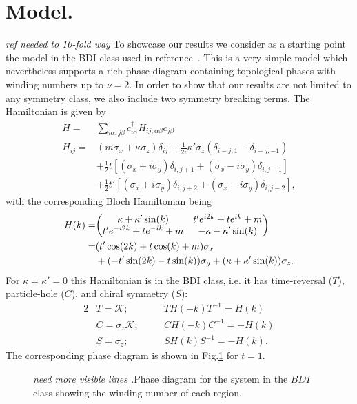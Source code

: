 \documentclass[twocolumn,amsmath,longbibliography,amssymb,superscriptaddress]{revtex4-1}
\newcommand{\mariac}[1]{{\it\color{cyan}#1}}
\begin{document}
\section{Model.}
\mariac{ref needed to 10-fold way}
To showcase our results we consider as a starting point the model in the BDI class used in reference~\cite{Song2014}. 
This is a very simple model which nevertheless supports a rich phase diagram containing topological phases with winding numbers up to $\nu =2$. 
In order to show that our results are not limited to any symmetry class, we also include two symmetry breaking terms. 
The Hamiltonian is  given by
\begin{align}
H =& \sum_{i\alpha,j\beta} c_{i\alpha}^\dagger H_{ij,\alpha \beta} c_{j\beta} \\
H_{ij} =& (m \sigma_x + \kappa \sigma_z)\delta_{ij}  + \frac{1}{2i}\kappa'\sigma_z (\delta_{i-j,1}-\delta_{i-j,-1})\nonumber\\
&+ \frac{1}{2} t \left[(\sigma_x + i \sigma_y)\delta_{i,j+1} + (\sigma_x - i \sigma_y) \delta_{i,j-1} \right] \nonumber\\
&+  \frac{1}{2} t' \left[(\sigma_x + i \sigma_y)\delta_{i,j+2} + (\sigma_x - i \sigma_y) \delta_{i,j-2} \right],
\label{bdi_model}
\end{align}
with the corresponding Bloch Hamiltonian being
\begin{align}
H(k)=&\mqty( \kappa + \kappa' \sin(k) & t' e^{i2k} + t e^{ik}+m \nonumber\\t' e^{-i2k} + t e^{-ik}+m & -\kappa-\kappa' \sin(k)  )\nonumber \\
=& (t' \cos(2k)+t\cos(k)+m)\sigma_x \\
&+ (-t' \sin(2k)-t\sin(k))\sigma_y + (\kappa+\kappa'\sin(k)) \sigma_z.\nonumber
\end{align}
For $\kappa = \kappa' = 0$ this Hamiltonian is in the BDI class, i.e. it has time-reversal ($T$), particle-hole ($C$), and chiral symmetry ($S$):
\begin{alignat}{2}
&T = \mathcal{K} ; \quad &&T H(-k) T^{-1} = H(k) \nonumber\\
&C = \sigma_z\mathcal{K} ; \quad &&C H(-k) C^{-1} = -H(k) \nonumber\\
&S = \sigma_z ; \quad &&S H(k)S^{-1} = -H(k) .
\end{alignat}
The corresponding phase diagram is shown in Fig.\ref{fig:bdi_phase_diagram} for $t=1$. 
\begin{figure}[t]
	\centering
	\hspace{0mm}
\caption{\mariac{need more visible lines .}Phase diagram for the system in the $BDI$ class showing the winding number of each region.}
\label{fig:bdi_phase_diagram}
\end{figure}
\end{document}
